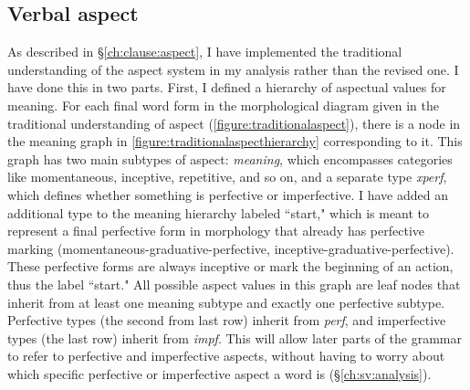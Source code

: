 \subsection{Verbal aspect} \label{ch:clause:analysis:aspect}

As described in \S\ref{ch:clause:aspect}, I have implemented the traditional understanding of the aspect system in my analysis rather than the revised one. I have done this in two parts. First, I defined a hierarchy of aspectual values for meaning. For each final word form in the morphological diagram given in the traditional understanding of aspect (\cref{figure:traditionalaspect}), there is a node in the meaning graph in \cref{figure:traditionalaspecthierarchy} corresponding to it. This graph has two main subtypes of aspect: \textit{meaning}, which encompasses categories like momentaneous, inceptive, repetitive, and so on, and a separate type \textit{xperf}, which defines whether something is perfective or imperfective. I have added an additional type to the meaning hierarchy labeled ``start," which is meant to represent a final perfective form in morphology that already has perfective marking (momentaneous-graduative-perfective, inceptive-graduative-perfective). These perfective forms are always inceptive or mark the beginning of an action, thus the label ``start." All possible aspect values in this graph are leaf nodes that inherit from at least one meaning subtype and exactly one perfective subtype. Perfective types (the second from last row) inherit from \textit{perf}, and imperfective types (the last row) inherit from \textit{impf}. This will allow later parts of the grammar to refer to perfective and imperfective aspects, without having to worry about which specific perfective or imperfective aspect a word is (\S\ref{ch:sv:analysis}).

